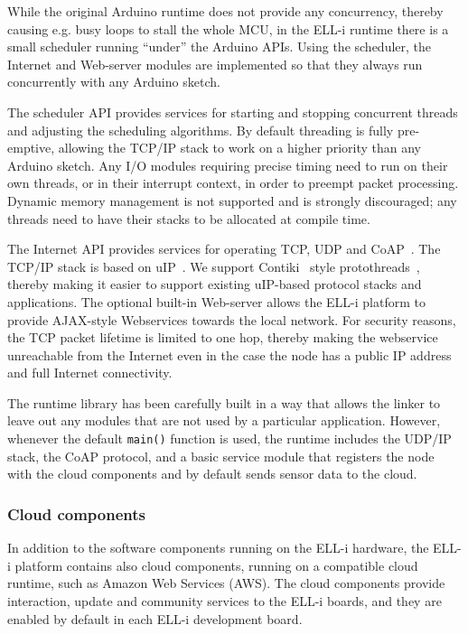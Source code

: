 \documentclass[final]{siamltex}
\begin{document}
While the original Arduino runtime does not provide any concurrency,
thereby causing e.g. busy loops to stall the whole MCU, in the ELL-i
runtime there is a small scheduler running ``under'' the Arduino
APIs.  Using the scheduler, the Internet and Web-server modules are
implemented so that they always run concurrently with any Arduino
sketch.  %

The scheduler API provides services for starting and stopping concurrent
threads and adjusting the scheduling algorithms.  By default threading
is fully pre-emptive, allowing the TCP/IP stack to work on a higher
priority than any Arduino sketch.  Any I/O modules requiring precise
timing need to run on their own threads, or in their interrupt
context, in order to preempt packet processing.  Dynamic memory
management is not supported and is strongly discouraged; any threads
need to have their stacks to be allocated at compile time.

The Internet API provides services for operating TCP, UDP and
CoAP~\cite{shelby2013constrained}.  The TCP/IP stack is based on
uIP~\cite{dunkels2003full}.  We support Contiki~\cite{dunkels2004contiki}
style protothreads~\cite{dunkels2006protothreads}, thereby making it easier to
support existing uIP-based protocol stacks and applications.
The optional built-in Web-server allows the ELL-i platform to provide
AJAX-style Webservices towards the local network.  For security
reasons, the TCP packet lifetime is limited to one hop, thereby making
the webservice unreachable from the Internet even in the case the node
has a public IP address and full Internet connectivity.

The runtime library has been carefully built in a way that allows the
linker to leave out any modules that are not used by a particular
application.  However, whenever the default \hbox{\tt main()} function
is used, the runtime includes the UDP/IP stack, the CoAP protocol, and
a basic service module that registers the node with the cloud
components and by default sends sensor data to the cloud.

\subsubsection{Cloud components}

In addition to the software components running on the ELL-i hardware,
the ELL-i platform contains also cloud components, running on a
compatible cloud runtime, such as Amazon Web Services (AWS).
The cloud components provide interaction, update and community
services to the ELL-i boards, and they are enabled by default in each
ELL-i development board.
\end{document}
